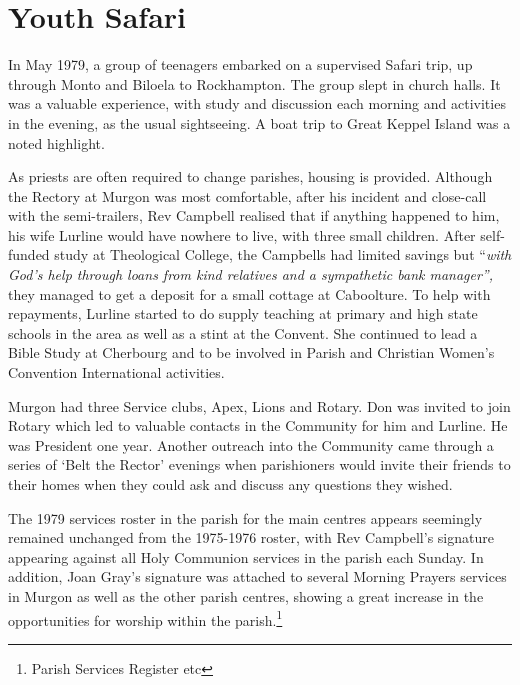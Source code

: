 \section{Youth Safari}



In May 1979, a group of teenagers embarked on a supervised Safari trip, up through Monto and Biloela to Rockhampton. The group slept in church halls. It was a valuable experience, with study and discussion each morning and activities in the evening, as the usual sightseeing. A boat trip to Great Keppel Island was a noted highlight.



As priests are often required to change parishes, housing is provided. Although the Rectory at Murgon was most comfortable, after his incident and close-call with the semi-trailers, Rev Campbell realised that if anything happened to him, his wife Lurline would have nowhere to live, with three small children. After self-funded study at Theological College, the Campbells had limited savings but ``\emph{with God's help through loans from kind relatives and a sympathetic bank manager'',} they managed to get a deposit for a small cottage at Caboolture. To help with repayments, Lurline started to do supply teaching at primary and high state schools in the area as well as a stint at the Convent. She continued to lead a Bible Study at Cherbourg and to be involved in Parish and Christian Women's Convention International activities.



Murgon had three Service clubs, Apex, Lions and Rotary. Don was invited to join Rotary which led to valuable contacts in the Community for him and Lurline. He was President one year. Another outreach into the Community came through a series of `Belt the Rector' evenings when parishioners would invite their friends to their homes when they could ask and discuss any questions they wished.



The 1979 services roster in the parish for the main centres appears seemingly remained unchanged from the 1975-1976 roster, with Rev Campbell's signature appearing against all Holy Communion services in the parish each Sunday. In addition, Joan Gray's signature was attached to several Morning Prayers services in Murgon as well as the other parish centres, showing a great increase in the opportunities for worship within the parish.\footnote{Parish Services Register etc}


